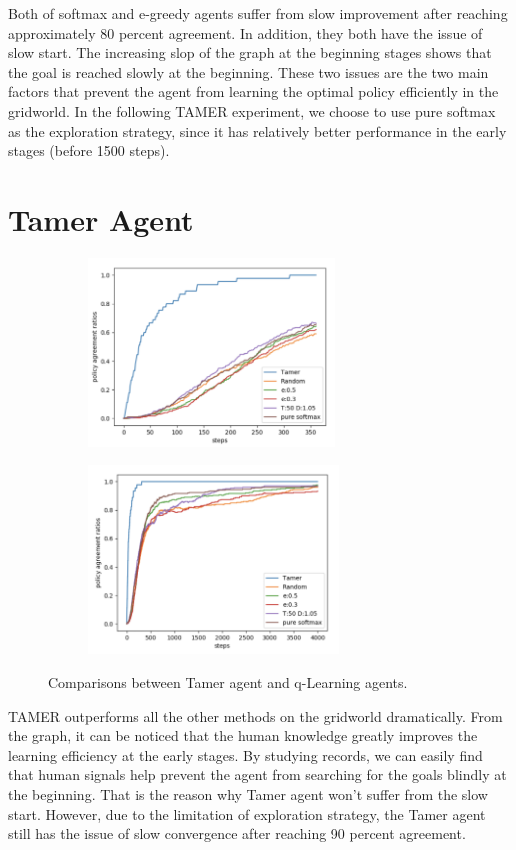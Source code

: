 \documentclass{article}
\begin{document}
Both of softmax and e-greedy agents suffer from slow improvement after reaching approximately 80 percent agreement. In addition, they both have the issue of slow start. The increasing slop of the graph at the beginning stages shows that the goal is reached slowly at the beginning. These two issues are the two main factors that prevent the agent from learning the optimal policy efficiently in the gridworld. In the following TAMER experiment, we choose to use pure softmax as the exploration strategy, since it has relatively better performance in the early stages (before 1500 steps).


\section{Tamer Agent}
\begin{figure}[h]
	\begin{subfigure}{0.5\textwidth}
		\includegraphics[width=0.9\linewidth, height=5cm]{images/all_0_400.png} 
		\caption{}
	\end{subfigure}
	\begin{subfigure}{0.5\textwidth}
		\includegraphics[width=0.9\linewidth, height=5cm]{images/all_0_4000.png}
		\caption{}
	\end{subfigure}
	\caption{Comparisons between Tamer agent and q-Learning agents.}
\end{figure}

TAMER outperforms all the other methods on the gridworld dramatically. From the graph, it can be noticed that the human knowledge greatly improves the learning efficiency at the early stages. By studying records, we can easily find that human signals help prevent the agent from searching for the goals blindly at the beginning. That is the reason why Tamer agent won't suffer from the slow start. However, due to the limitation of exploration strategy, the Tamer agent still has the issue of slow convergence after reaching 90 percent agreement.
\end{document}
